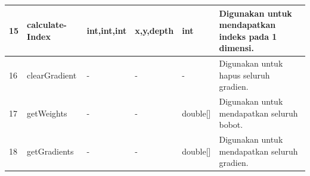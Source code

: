 \begin{small}
\begin{longtable}{|p{0.4cm}|p{2cm}|p{1.8cm}|p{1.8cm}|p{1.7cm}|p{3.55cm}|}
	\hline
	15 & calculate-\newline Index & int,\newline int,\newline int & x,\newline y,\newline depth & int & Digunakan untuk mendapatkan indeks pada 1 dimensi.\\
	\hline
	16 & clearGradient & - & - & - & Digunakan untuk hapus seluruh gradien.\\
	\hline
	17 & getWeights & - & - & double[] & Digunakan untuk mendapatkan seluruh bobot.\\
	\hline
	18 & getGradients & - & - & double[] & Digunakan untuk mendapatkan seluruh gradien.\\
	\hline
\end{longtable}
\end{small}
\endgroup

